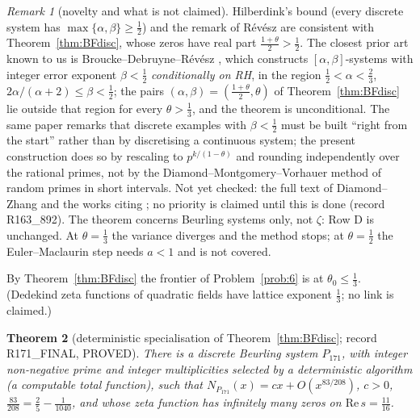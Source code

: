\documentclass[11pt]{amsart}
\newtheorem{theorem}{Theorem}[section]
\theoremstyle{definition}
\theoremstyle{remark}
\newtheorem{remark}[theorem]{Remark}
\newcommand{\Rel}{\mathrm{Re}\,}
\begin{document}
\begin{remark}[novelty and what is not claimed]\label{rem:BFnovelty}
Hilberdink's bound (every discrete system has $\max\{\alpha,\beta\}\ge\frac12$) and the remark of R\'ev\'esz
\cite[Rem.~7]{Revesz2023} are consistent with Theorem~\ref{thm:BFdisc}, whose zeros have real part $\frac{1+\theta}2>\frac12$.
The closest prior art known to us is Broucke--Debruyne--R\'ev\'esz \cite[Thm.~1.3]{BDR2023}, which constructs
$[\alpha,\beta]$-systems with integer error exponent $\beta<\frac12$ \emph{conditionally on RH}, in the region
$\frac12<\alpha<\frac23$, $2\alpha/(\alpha+2)\le\beta<\frac12$; the pairs $(\alpha,\beta)=(\frac{1+\theta}2,\theta)$ of
Theorem~\ref{thm:BFdisc} lie outside that region for every $\theta>\frac13$, and the theorem is unconditional. The same paper
remarks that discrete examples with $\beta<\frac12$ must be built ``right from the start'' rather than by discretising a
continuous system; the present construction does so by rescaling to $p^{k/(1-\theta)}$ and rounding independently over the
rational primes, not by the Diamond--Montgomery--Vorhauer method of random primes in short intervals. Not yet checked: the
full text of Diamond--Zhang \cite[Ch.~17]{DiamondZhang2016} and the works citing \cite{BDR2023}; no priority is claimed until
this is done (record R163\_892). The theorem concerns Beurling systems only, not $\zeta$: Row D is unchanged. At $\theta=\frac13$ the
variance diverges and the method stops; at $\theta=\frac12$ the Euler--Maclaurin step needs $a<1$ and is not covered.
\end{remark}

\noindent By Theorem~\ref{thm:BFdisc} the frontier of Problem~\ref{prob:6} is at $\theta_0\le\frac13$. (Dedekind zeta
functions of quadratic fields have lattice exponent $\frac13$; no link is claimed.)

\begin{theorem}[deterministic specialisation of Theorem~\ref{thm:BFdisc}; record R171\_FINAL, PROVED]\label{thm:P171}
There is a discrete Beurling system $P_{171}$, with integer non-negative prime and integer multiplicities selected by a deterministic
algorithm (a computable total function), such that $N_{P_{171}}(x)=cx+O(x^{83/208})$, $c>0$, $\frac{83}{208}=\frac25-\frac1{1040}$, and
whose zeta function has infinitely many zeros on $\Rel s=\frac{11}{16}$.
\end{theorem}
\end{document}
